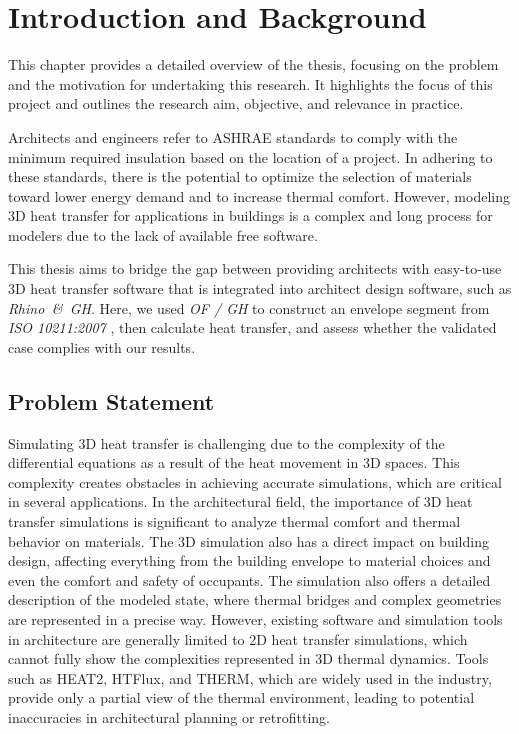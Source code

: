 \chapter{Introduction and Background}
This chapter provides a detailed overview of the thesis, focusing on the problem and the motivation for undertaking this research. It highlights the focus of this project and outlines the research aim, objective, and relevance in practice.

Architects and engineers refer to ASHRAE standards to comply with the minimum required insulation based on the location of a project. 
In adhering to these standards, there is the potential to optimize the selection of materials toward lower energy demand and to increase thermal comfort. 
However, modeling 3D heat transfer for applications in buildings is a complex and long process for modelers due to the lack of available free software. 

This thesis aims to bridge the gap between providing architects with easy-to-use 3D heat transfer software that is integrated into architect design software, such as \textit{Rhino\, \&\, \gls{GH}}. Here, we used \textit{\gls{OF} / \gls{GH}} to construct an envelope segment from \textit{ISO 10211:2007}
\cite{ISO}, then calculate heat transfer, and assess whether the validated case complies with our results. 



\section{Problem Statement}
Simulating 3D heat transfer is challenging due to the complexity of the differential equations as a result of the heat movement in 3D spaces. This complexity creates obstacles in achieving accurate simulations, which are critical in several applications. In the architectural field, the importance of 3D heat transfer simulations is significant to analyze thermal comfort and thermal behavior on materials. The 3D simulation also has a direct impact on building design, affecting everything from the building envelope to material choices and even the comfort and safety of occupants. The simulation also offers a detailed description of the modeled state, where thermal bridges and complex geometries are represented in a precise way.
However, existing software and simulation tools in architecture are generally limited to 2D heat transfer simulations, which cannot fully show the complexities represented in 3D thermal dynamics. Tools such as HEAT2, HTFlux, and THERM, which are widely used in the industry, provide only a partial view of the thermal environment, leading to potential inaccuracies in architectural planning or retrofitting.

